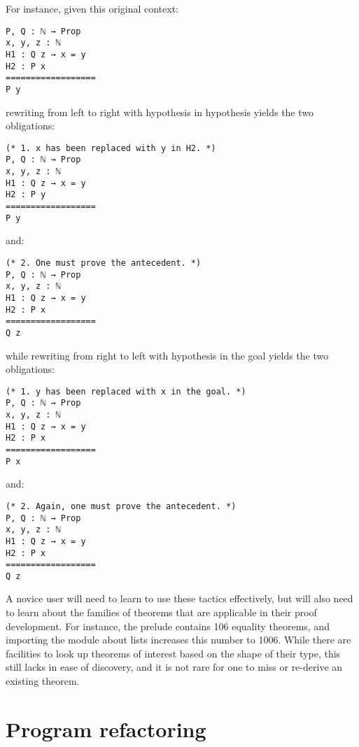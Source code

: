For instance, given this original context:

\begin{verbatim}
P, Q : ℕ → Prop
x, y, z : ℕ
H1 : Q z → x = y
H2 : P x
==================
P y
\end{verbatim}

rewriting from left to right with hypothesis  in hypothesis
 yields the two obligations:

\begin{verbatim}
(* 1. x has been replaced with y in H2. *)
P, Q : ℕ → Prop
x, y, z : ℕ
H1 : Q z → x = y
H2 : P y
==================
P y
\end{verbatim}

and:

\begin{verbatim}
(* 2. One must prove the antecedent. *)
P, Q : ℕ → Prop
x, y, z : ℕ
H1 : Q z → x = y
H2 : P x
==================
Q z
\end{verbatim}

while rewriting from right to left with hypothesis  in the goal
yields the two obligations:

\begin{verbatim}
(* 1. y has been replaced with x in the goal. *)
P, Q : ℕ → Prop
x, y, z : ℕ
H1 : Q z → x = y
H2 : P x
==================
P x
\end{verbatim}

and:

\begin{verbatim}
(* 2. Again, one must prove the antecedent. *)
P, Q : ℕ → Prop
x, y, z : ℕ
H1 : Q z → x = y
H2 : P x
==================
Q z
\end{verbatim}

A novice user will need to learn to use these tactics effectively, but will also
need to learn about the families of theorems that are applicable in their proof
development.  For instance, the \Coq{} prelude contains 106 equality theorems,
and importing the module about lists increases this number to 1006.  While there
are facilities to look up theorems of interest based on the shape of their type,
this still lacks in ease of discovery, and it is not rare for one to miss or
re-derive an existing theorem.

\section{Program refactoring}

